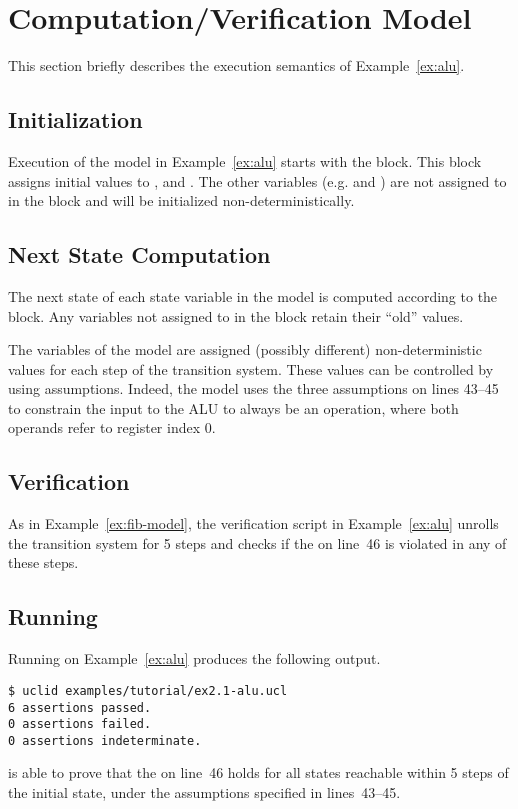 \section{Computation/Verification Model}
This section briefly describes the execution semantics of Example~\ref{ex:alu}.

\subsection{Initialization}
Execution of the model in Example~\ref{ex:alu} starts with the  block. This block assigns initial values to ,  and . The other variables (e.g.  and ) are not assigned to in the  block and will be initialized non-deterministically.

\subsection{Next State Computation}
The next state of each state variable in the model is computed according to the  block. Any variables not assigned to in the  block retain their ``old'' values. 

The  variables of the model are assigned (possibly different) non-deterministic values for each step of the transition system. These values can be controlled by using assumptions. Indeed, the model uses the three assumptions on lines 43--45 to constrain the input to the ALU to always be an  operation, where both operands refer to register index 0. 

\subsection{Verification}
As in Example~\ref{ex:fib-model}, the verification script in Example~\ref{ex:alu} unrolls the transition system for 5 steps and checks if the  on line~46 is violated in any of these steps. 

\subsection{Running \uclid{}}

Running \uclid{} on Example~\ref{ex:alu} produces the following output.

\begin{Verbatim}[frame=single, samepage=true]
$ uclid examples/tutorial/ex2.1-alu.ucl 
6 assertions passed.
0 assertions failed.
0 assertions indeterminate.
\end{Verbatim}

\uclid{} is able to prove that the  on line~46 holds for all states reachable within 5 steps of the initial state, under the assumptions specified in lines~43--45.
